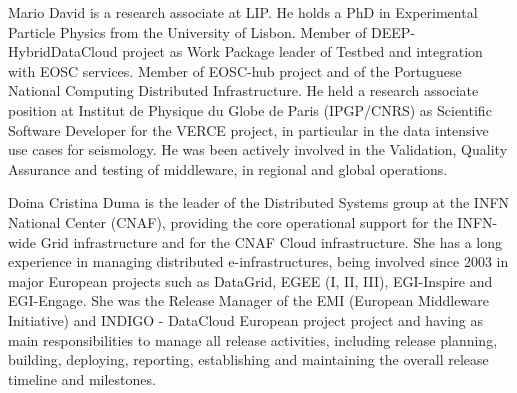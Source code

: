 \documentclass[journal]{IEEEtran}
\begin{document}
\begin{IEEEbiography}{Mario David}
is a research associate at LIP. He holds a PhD in Experimental Particle Physics from the University of Lisbon.
Member of DEEP-HybridDataCloud project as Work Package leader of Testbed and integration with EOSC services. Member of EOSC-hub project and
of the Portuguese National Computing Distributed Infrastructure.
He held a research associate position at Institut de Physique du Globe de Paris (IPGP/CNRS) as Scientific Software Developer for the VERCE project, in particular in the data intensive use cases for seismology.
He was been actively involved in the Validation, Quality Assurance and testing of middleware, in regional and global operations.
\end{IEEEbiography}

\begin{IEEEbiography}{Doina Cristina Duma}
is the leader of the Distributed Systems group at the INFN National Center (CNAF), providing the core operational support for the INFN-wide Grid infrastructure and for the CNAF Cloud infrastructure. She has a long experience in managing distributed e-infrastructures, being involved since 2003 in major European projects such as DataGrid, EGEE (I, II, III), EGI-Inspire and EGI-Engage. She was the Release Manager of the EMI (European Middleware Initiative) and INDIGO - DataCloud European project project and having as main responsibilities to manage all release activities, including release planning, building, deploying, reporting, establishing and maintaining the overall release timeline and milestones.
\end{IEEEbiography}
\end{document}
